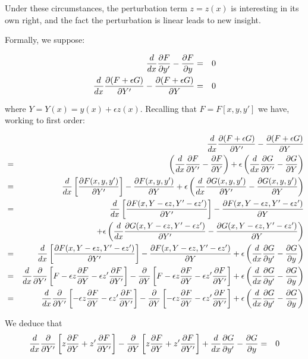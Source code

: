 \documentclass[pdflatex,sn-mathphys-num]{sn-jnl}%
\theoremstyle{thmstyleone}%
\theoremstyle{thmstyletwo}%
\theoremstyle{thmstylethree}%
\begin{document}
Under these circumstances, the perturbation term $z=z(x)$ is
interesting in its own right, and the fact the perturbation is linear
leads to new insight.

Formally, we suppose:

\begin{eqnarray}
  \frac{d}{dx}\frac{\partial{F}}{\partial{y'}}-\frac{\partial{F}}{\partial{y}} &=& 0\nonumber\\
  \frac{d}{dx}\frac{\partial{(F+\epsilon G)}}{\partial{Y'}}-\frac{\partial{(F+\epsilon G)}}{\partial{Y}} &=& 0
\end{eqnarray}

where $Y=Y(x) = y(x) + \epsilon z(x)$. Recalling that $F=F[x,y,y']$ we
have, working to first order:

\begin{eqnarray}
  {} &{}&
  \frac{d}{dx}\frac{\partial{(F+\epsilon G)}}{\partial{Y'}}-\frac{\partial{(F+\epsilon G)}}{\partial{Y}}\nonumber\\
  &=&  \left(\frac{d}{dx}\frac{\partial{F}}{\partial{Y'}}-\frac{\partial{F}}{\partial{Y}}\right) + \epsilon\left(\frac{d}{dx}\frac{\partial{G}}{\partial{Y'}}-\frac{\partial{G}}{\partial{Y}}\right)\nonumber\\
  &=&  \frac{d}{dx}\left[\frac{\partial{F(x,y,y')}}{\partial{Y'}}\right] - \frac{\partial{F(x,y,y')}}{\partial{Y}}
  + \epsilon\left(\frac{d}{dx}\frac{\partial{G(x,y,y')}}{\partial{Y'}}-\frac{\partial{G(x,y,y')}}{\partial{Y}}\right)\nonumber\\
  &=&  \frac{d}{dx}\left[\frac{\partial{F(x,Y-\epsilon z,Y'-\epsilon z')}}{\partial{Y'}}\right] -\frac{\partial{F(x,Y-\epsilon z,Y'-\epsilon z')}}{\partial{Y}}\nonumber\\
  &{}&\qquad  + \epsilon\left(\frac{d}{dx}\frac{\partial{G(x,Y-\epsilon z,Y'-\epsilon z')}}{\partial{Y'}}-\frac{\partial{G(x,Y-\epsilon z,Y'-\epsilon z')}}{\partial{Y}}\right)\nonumber\\
  &=&  \frac{d}{dx}\left[\frac{\partial{F(x,Y-\epsilon z,Y'-\epsilon z')}}{\partial{Y'}}\right]-\frac{\partial{F(x,Y-\epsilon z,Y'-\epsilon z')}}{\partial{Y}}
  + \epsilon\left(\frac{d}{dx}\frac{\partial{G}}{\partial{y'}} - \frac{\partial{G}}{\partial{y}}\right)\nonumber\\
  &=&  \frac{d}{dx}\frac{\partial{}}{\partial{Y'}}\left[F -\epsilon z\frac{\partial{F}}{\partial{Y}} - \epsilon z'\frac{\partial{F}}{\partial{Y'}}\right]
  - \frac{\partial{}}{\partial{Y}}\left[F -\epsilon z\frac{\partial{F}}{\partial{Y}} - \epsilon z'\frac{\partial{F}}{\partial{Y'}}\right]
  + \epsilon\left(\frac{d}{dx}\frac{\partial{G}}{\partial{y'}} - \frac{\partial{G}}{\partial{y}}\right)\nonumber\\
  &=&  \frac{d}{dx}\frac{\partial{}}{\partial{Y'}}\left[-\epsilon z\frac{\partial{F}}{\partial{Y}} - \epsilon z'\frac{\partial{F}}{\partial{Y'}}\right]
  - \frac{\partial{}}{\partial{Y}}\left[-\epsilon z\frac{\partial{F}}{\partial{Y}} - \epsilon z'\frac{\partial{F}}{\partial{Y'}}\right]
  + \epsilon\left(\frac{d}{dx}\frac{\partial{G}}{\partial{y'}} - \frac{\partial{G}}{\partial{y}}\right)\nonumber\\
\end{eqnarray}

We deduce that
\begin{eqnarray}
\frac{d}{dx}\di{}{Y'}\left[z\di{F}{Y} + z'\di{F}{Y'}\right]
  - \di{}{Y}\left[z\di{F}{Y} + z'\di{F}{Y'}\right] +  \el{G} &=&0\nonumber\\

\end{eqnarray}



\end{document}
